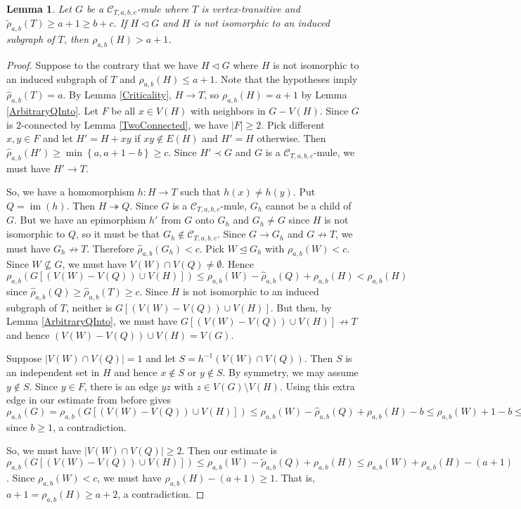 \documentclass[12pt]{amsart}
\theoremstyle{plain}
\newtheorem{lem}[thm]{Lemma}
\theoremstyle{definition}
\theoremstyle{remark}
\newcommand{\fancy}[1]{\mathcal{#1}}
\newcommand{\C}{\fancy{C}}
\newcommand{\surj}{\twoheadrightarrow}
\newcommand{\set}[1]{\left\{ #1 \right\}}
\newcommand{\card}[1]{\left|#1\right|}
\newcommand{\func}[3]{#1\colon #2 \rightarrow #3}
\newcommand{\parens}[1]{\left( #1 \right)}
\newcommand{\brackets}[1]{\left[ #1 \right]}
\newcommand{\im}{\operatorname{im}}
\begin{document}
\begin{lem}\label{PlusOne}
Let $G$ be a $\C_{T,a,b,c}$-mule where $T$ is vertex-transitive and $\tilde{\rho}_{a,b}(T) \ge a + 1 \ge b + c$. If $H \lhd G$ and $H$ is not isomorphic to an induced subgraph of $T$, then $\rho_{a,b}(H) > a + 1$.
\end{lem}
\begin{proof}
Suppose to the contrary that we have $H \lhd G$ where $H$ is not isomorphic to an induced subgraph of $T$ and $\rho_{a,b}(H) \le a + 1$.  Note that the hypotheses imply $\hat{\rho}_{a,b}(T) = a$.  By Lemma \ref{Criticality}, $H \rightarrow T$, so $\rho_{a,b}(H) = a + 1$ by Lemma \ref{ArbitraryQInto}.  Let $F$ be all $x \in V(H)$ with neighbors in $G - V(H)$.  Since $G$ is $2$-connected by Lemma \ref{TwoConnected}, we have $|F| \ge 2$.  Pick different $x,y \in F$ and let $H' = H + xy$ if $xy \not \in E(H)$ and $H' = H$ otherwise.  Then $\hat{\rho}_{a,b}(H') \ge \min\set{a, a + 1 - b} \ge c$.  Since $H' \prec G$ and $G$ is a $\C_{T,a,b,c}$-mule, we must have $H' \rightarrow T$.

So, we have a homomorphism $\func{h}{H}{T}$ such that $h(x) \ne h(y)$.  Put $Q = \im(h)$. Then $H \surj Q$. Since $G$ is a $\C_{T,a,b,c}$-mule, $G_h$ cannot be a child of $G$.  But we have an epimorphism $h'$ from $G$ onto $G_h$ and $G_h \ne G$ since $H$ is not isomorphic to $Q$, so it must be that $G_h \not \in \C_{T,a,b,c}$.  Since $G \rightarrow G_h$ and $G \not \rightarrow T$, we must have $G_h \not \rightarrow T$.  Therefore $\hat{\rho}_{a,b}(G_h) < c$.  Pick $W \unlhd G_h$ with $\rho_{a,b}(W) < c$.  Since $W \not \subseteq G$, we must have $V(W) \cap V(Q) \ne \emptyset$.  Hence $\rho_{a,b}\parens{G\brackets{(V(W) - V(Q)) \cup V(H)}} \le \rho_{a,b}(W) - \hat{\rho}_{a,b}(Q) + \rho_{a,b}(H) < \rho_{a,b}(H)$ since $\hat{\rho}_{a,b}(Q) \ge \hat{\rho}_{a,b}(T) \ge c$.  Since $H$ is not isomorphic to an induced subgraph of $T$, neither is $G\brackets{(V(W) - V(Q)) \cup V(H)}$.  But then, by Lemma \ref{ArbitraryQInto}, we must have $G\brackets{(V(W) - V(Q)) \cup V(H)} \not \rightarrow T$ and hence $(V(W) - V(Q)) \cup V(H) = V(G)$.

Suppose $\card{V(W) \cap V(Q)} = 1$ and let $S = h^{-1}(V(W) \cap V(Q))$. Then $S$ is an independent set in $H$ and hence $x \not \in S$ or $y \not \in S$.  By symmetry, we may assume $y \not \in S$.  Since $y \in F$, there is an edge $yz$ with $z \in V(G)\setminus V(H)$.  Using this extra edge in our estimate from before gives $\rho_{a,b}(G) = \rho_{a,b}\parens{G\brackets{(V(W) - V(Q)) \cup V(H)}} \le \rho_{a,b}(W) - \hat{\rho}_{a,b}(Q) + \rho_{a,b}(H) - b \le \rho_{a,b}(W) + 1 - b \le \rho_{a,b}(W) < c$ since $b \ge 1$, a contradiction.

So, we must have $\card{V(W) \cap V(Q)} \ge 2$.  Then our estimate is $\rho_{a,b}\parens{G\brackets{(V(W) - V(Q)) \cup V(H)}} \le \rho_{a,b}(W) - \tilde{\rho}_{a,b}(Q) + \rho_{a,b}(H) \le
\rho_{a,b}(W) + \rho_{a,b}(H) - (a+1)$.  Since $\rho_{a,b}(W) < c$, we must have $\rho_{a,b}(H) - (a+1) \ge 1$.  That is, $a + 1 = \rho_{a,b}(H) \ge a + 2$, a contradiction.
\end{proof}
\end{document}
